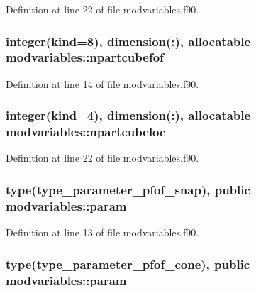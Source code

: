 Definition at line 22 of file modvariables.\-f90.

\hypertarget{classmodvariables_a5e0afff3c4cb1ac79dd8ec2f3a7752d9}{
\subsubsection[{npartcubefof}]{\setlength{\rightskip}{0pt plus 5cm}integer(kind=8), dimension(\-:), allocatable modvariables\-::npartcubefof}}\label{classmodvariables_a5e0afff3c4cb1ac79dd8ec2f3a7752d9}


Definition at line 14 of file modvariables.\-f90.

\hypertarget{classmodvariables_a32098f5e276eab031b1feebf7124f8bf}{
\subsubsection[{npartcubeloc}]{\setlength{\rightskip}{0pt plus 5cm}integer(kind=4), dimension(\-:), allocatable modvariables\-::npartcubeloc}}\label{classmodvariables_a32098f5e276eab031b1feebf7124f8bf}


Definition at line 22 of file modvariables.\-f90.

\hypertarget{classmodvariables_a582ad50b5bf32797acb78e1df3d62208}{
\subsubsection[{param}]{\setlength{\rightskip}{0pt plus 5cm}type(type\-\_\-parameter\-\_\-pfof\-\_\-snap), public modvariables\-::param}}\label{classmodvariables_a582ad50b5bf32797acb78e1df3d62208}


Definition at line 13 of file modvariables.\-f90.

\hypertarget{classmodvariables_ae13e648c61e7efdc91f1485b2c3b3e5e}{
\subsubsection[{param}]{\setlength{\rightskip}{0pt plus 5cm}type(type\-\_\-parameter\-\_\-pfof\-\_\-cone), public modvariables\-::param}}\label{classmodvariables_ae13e648c61e7efdc91f1485b2c3b3e5e}


